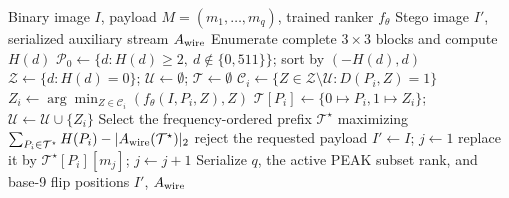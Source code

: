 \documentclass[a4paper,fleqn]{cas-dc}
\begin{document}
\begin{algorithm*}[t]
\caption{Net-Aware CNN-Ranked Distance-One Embedding}
\label{alg:embedding}
\begin{algorithmic}[1]
\Require Binary image $I$, payload $M=(m_1,\ldots,m_q)$, trained ranker $f_\theta$
\Ensure Stego image $I'$, serialized auxiliary stream $A_{\rm wire}$
\State Enumerate complete $3\times3$ blocks and compute $H(d)$
\State $\mathcal P_0\gets\{d:H(d)\ge2,\ d\notin\{0,511\}\}$; sort by $(-H(d),d)$
\State $\mathcal Z\gets\{d:H(d)=0\}$; $\mathcal U\gets\emptyset$; $\mathcal T\gets\emptyset$
    \State $\mathcal C_i\gets\{Z\in\mathcal Z\setminus\mathcal U:D(P_i,Z)=1\}$
        \State $Z_i\gets\arg\min_{Z\in\mathcal C_i}(f_\theta(I,P_i,Z),Z)$
        \State $\mathcal T[P_i]\gets\{0\mapsto P_i,1\mapsto Z_i\}$;
        $\mathcal U\gets\mathcal U\cup\{Z_i\}$
    \EndIf
\EndFor
\State Select the frequency-ordered prefix $\mathcal T^\star$ maximizing
$\sum_{P_i\in\mathcal T^\star}H(P_i)-|A_{\rm wire}(\mathcal T^\star)|_2$
    \State reject the requested payload
\EndIf
\State $I'\gets I$; $j\gets1$
        \State replace it by $\mathcal T^\star[P_i][m_j]$; $j\gets j+1$
    \EndIf
\EndFor
\State Serialize $q$, the active PEAK subset rank, and base-9 flip positions
\State \Return $I'$, $A_{\rm wire}$
\end{algorithmic}
\end{algorithm*}
\end{document}
